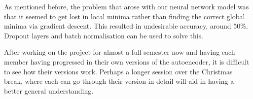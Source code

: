 As mentioned before, the problem that arose with our neural network model was that it seemed to get lost in local minima rather than finding the correct global minima via gradient descent. This resulted in undesirable accuracy, around 50\%. Dropout layers and batch normalisation can be used to solve this.

After working on the project for almost a full semester now and having each member having progressed in their own versions of the autoencoder, it is difficult to see how their versions work. Perhaps a longer session over the Christmas break, where each can go through their version in detail will aid in having a better general understanding.
